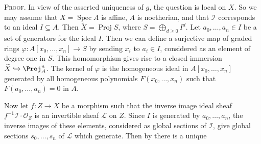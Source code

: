 {\smallskip
\noindent\textsc{Proof.} In view of the asserted uniqueness of $g$, the question is local on $X$. So we may assume that $X=\operatorname{Spec}A$ is affine, $A$ is noetherian, and that $\mathcal I$ corresponds to an ideal $I\subseteq A$. Then $\widetilde X=\operatorname{Proj}S$, where $S=\bigoplus_{d\geq0}I^d$. Let $a_0,\ldots,a_n\in I$ be a set of generators for the ideal $I$. Then we can define a surjective map of graded rings $\varphi\colon A[x_0,\ldots,x_n]\to S$ by sending $x_i$ to $a_i\in I$, considered as an element of degree one in $S$. This homomorphism gives rise to a closed immersion $\widetilde X\hookrightarrow\Proj_A^n$. The kernel of $\varphi$ is the homogeneous ideal in $A[x_0,\ldots,x_n]$ generated by all homogeneous polynomials $F(x_0,\ldots,x_n)$ such that $F(a_0,\ldots,a_n)=0$ in $A$.

Now let $f\colon Z\to X$ be a morphism such that the inverse image ideal sheaf $f^{-1}\mathcal I\cdot\mathcal O_Z$ is an invertible sheaf $\mathcal L$ on $Z$. Since $I$ is generated by $a_0,\ldots,a_n$, the inverse images of these elements, considered as global sections of $\mathcal I$, give global sections $s_0,\ldots,s_n$ of $\mathcal L$ which generate. Then by  there is a unique
}
